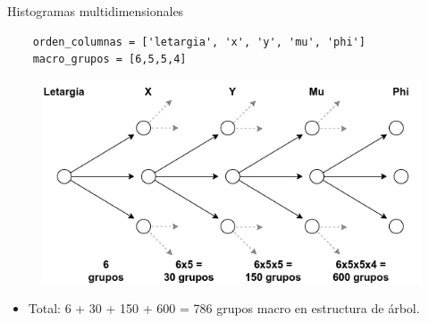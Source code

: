\documentclass[aspectratio=169,english]{beamer}
\begin{document}
\begin{frame}[fragile]{Histogramas multidimensionales}

    \begin{verbatim}
    orden_columnas = ['letargia', 'x', 'y', 'mu', 'phi']
    macro_grupos = [6,5,5,4]
    \end{verbatim}

    \begin{figure}
        \centering
        \includegraphics[width=0.6\linewidth]{imagens/grupos.png}
        \label{fig:esquema31}
    \end{figure}

    \begin{itemize}
        \item Total: 6 + 30 + 150 + 600 = 786 grupos macro en estructura de árbol.
    \end{itemize}

\end{frame}
\end{document}
